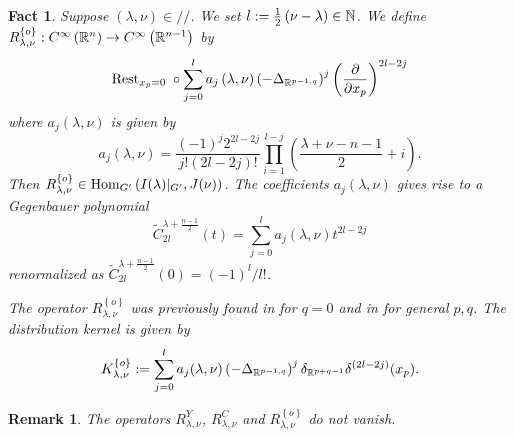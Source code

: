 \documentclass[reqno,12pt]{pja00} %
\newcommand{\Hom}{\mbox{\normalfont Hom}}
\newtheorem{remark}[theorem]{Remark}
\newtheorem{fact}[theorem]{Fact}
\theoremstyle{definition}
\theoremstyle{exampstyle} \newtheorem{examp}[theorem]{Theorem}
\begin{document}
\begin{fact}\label{fact:singo}
	Suppose $(\lambda,\nu)\in//$. We set $l:=\frac{1}{2}\left( \nu-\lambda \right)\in\mathbb{N}$.
	We define $R_{\lambda,\nu}^{ \left\{ o \right\}}:C^\infty\left( \mathbb{R}^n \right)\to C^\infty\left( \mathbb{R}^{n-1} \right)$ by
	\begin{equation*}
		\mbox{\normalfont Rest}_{x_p=0}\;\circ
	\sum_{j=0}^la_j\left( \lambda,\nu \right)\left(- \Delta_{\mathbb{R}^{p-1,q}} \right)^j\left( \frac{\partial}{\partial x_p} \right)^{2l-2j}
	\end{equation*}
	where $a_j(\lambda,\nu)$ is given by\begin{equation*}
		a_j(\lambda,\nu)=\frac{(-1)^j2^{2l-2j}}{j!(2l-2j)!}\prod_{i=1}^{l-j}\left(\frac{\lambda+\nu-n-1}{2} 
		+i \right).
	\end{equation*}
	Then $R_{\lambda,\nu}^{ \left\{ o \right\}}\in\Hom_{G'}\left( I(\lambda)\kern-0.1cm\mid_{G'},J(\nu) \right)$.
	The coefficients $a_j(\lambda,\nu)$ gives rise to a Gegenbauer polynomial\begin{equation*}
		\tilde{C}_{2l}^{\lambda+\frac{n-1}{2}}(t)=\sum_{j=0}^la_j(\lambda,\nu)t^{2l-2j}
	\end{equation*}
	renormalized as $\tilde{C}_{2l}^{\lambda+\frac{n-1}{2}}(0)=\left( -1 \right)^l/l!$.

	The operator $R_{\lambda,\nu}^{\left\{ o \right\}}$
	was previously found in \cite[Thms.\ 5.1.1 and 5.2.1]{juhl2009families} for $q=0$ and in \cite[Thm.\ 4.3]{kobayashi2015branching}
	for general $p,q$.
	The distribution kernel is given by
	\begin{equation*}
		K_{\lambda,\nu}^{ \left\{ o \right\} }:=\sum_{j=0}^la_j(\lambda,\nu)\left( -\Delta_{\R^{p-1,q}} \right)^j\delta_{\R^{p+q-1}}\delta^{\left( 2l-2j \right)}(x_p).
	\end{equation*}
\end{fact}
\begin{remark}\label{rmk:thm:construction}
	The operators $R_{\lambda,\nu}^Y$, $R_{\lambda,\nu}^C$ and $R^{ \left\{ o \right\}}_{\lambda,\nu}$ do not vanish.
\end{remark}
\end{document}
